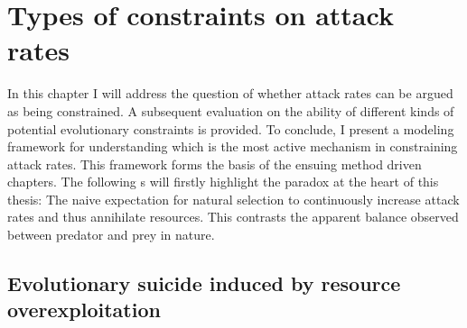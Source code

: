 \documentclass[a4paper]{report}
\begin{document}
\chapter{Types of constraints on attack rates \label{ch:chapter_1}}

In this chapter I will address the question of whether attack rates can be argued as being constrained. A subsequent evaluation on the ability of different kinds of potential evolutionary constraints is provided. To conclude, I present a modeling framework for understanding which is the most active mechanism in constraining attack rates. This framework forms the basis of the ensuing method driven chapters. The following s will firstly highlight the paradox at the heart of this thesis: The naive expectation for natural selection to continuously increase attack rates and thus annihilate resources. This contrasts the apparent balance observed between predator and prey in nature. \\

\section{Evolutionary suicide induced by resource overexploitation}
\end{document}
